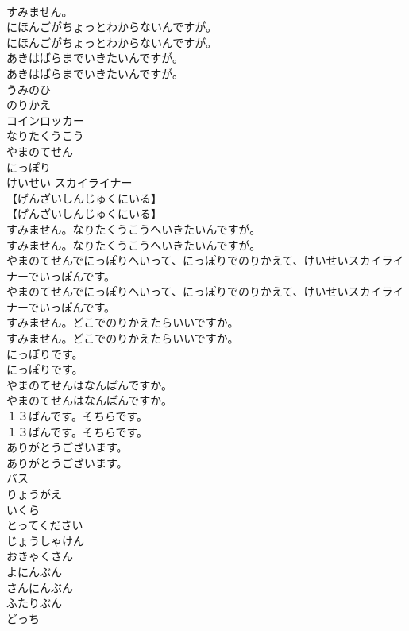 \documentclass[8pt]{extreport}
\begin{document}
\begin{CJK}{UTF8}{min}
\\	すみません。 
\\	にほんごがちょっとわからないんですが。	
\\	にほんごがちょっとわからないんですが。 
\\	あきはばらまでいきたいんですが。	
\\	あきはばらまでいきたいんですが。 
\\	うみのひ
\\	のりかえ
\\	コインロッカー
\\	なりたくうこう
\\	やまのてせん
\\	にっぽり
\\	けいせい スカイライナー
\\	【げんざいしんじゅくにいる】	
\\	【げんざいしんじゅくにいる】 
\\	すみません。なりたくうこうへいきたいんですが。	
\\	すみません。なりたくうこうへいきたいんですが。 
\\	やまのてせんでにっぽりへいって、にっぽりでのりかえて、けいせいスカイライナーでいっぽんです。	
\\	やまのてせんでにっぽりへいって、にっぽりでのりかえて、けいせいスカイライナーでいっぽんです。 
\\	すみません。どこでのりかえたらいいですか。	
\\	すみません。どこでのりかえたらいいですか。 
\\	にっぽりです。	
\\	にっぽりです。 
\\	やまのてせんはなんばんですか。	
\\	やまのてせんはなんばんですか。 
\\	１３ばんです。そちらです。	
\\	１３ばんです。そちらです。 
\\	ありがとうございます。	
\\	ありがとうございます。 
\\	バス
\\	りょうがえ
\\	いくら
\\	とってください
\\	じょうしゃけん
\\	おきゃくさん
\\	よにんぶん
\\	さんにんぶん
\\	ふたりぶん
\\	どっち

\end{CJK}
\end{document}
